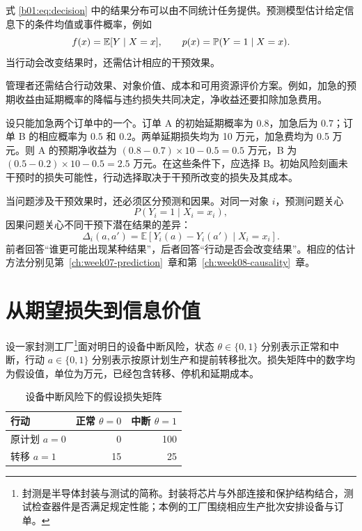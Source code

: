 式 \eqref{b01:eq:decision} 中的结果分布可以由不同统计任务提供。预测模型估计给定信息下的条件均值或事件概率，例如
\[
f(x)=\mathbb E[Y\mid X=x],\qquad p(x)=\mathbb P(Y=1\mid X=x).
\]
当行动会改变结果时，还需估计相应的干预效果。

管理者还需结合行动效果、对象价值、成本和可用资源评价方案。例如，加急的预期收益由延期概率的降幅与违约损失共同决定，净收益还要扣除加急费用。

\begin{example}[风险排序与行动选择]
设只能加急两个订单中的一个。订单 A 的初始延期概率为 \(0.8\)，加急后为 \(0.7\)；订单 B 的相应概率为 \(0.5\) 和 \(0.2\)。两单延期损失均为 10 万元，加急费均为 0.5 万元。则 A 的预期净收益为 \((0.8-0.7)\times10-0.5=0.5\) 万元，B 为 \((0.5-0.2)\times10-0.5=2.5\) 万元。在这些条件下，应选择 B。初始风险刻画未干预时的损失可能性，行动选择取决于干预所改变的损失及其成本。
\end{example}

当问题涉及干预效果时，还必须区分预测和因果。对同一对象 \(i\)，预测问题关心
\[
P(Y_i=1\mid X_i=x_i),
\]
因果问题关心不同干预下潜在结果的差异：
\[
\Delta_i(a,a')
=
\mathbb E\!\left[Y_i(a)-Y_i(a')\mid X_i=x_i\right].
\]
前者回答“谁更可能出现某种结果”，后者回答“行动是否会改变结果”。相应的估计方法分别见第~\ref{ch:week07-prediction}~章和第~\ref{ch:week08-causality}~章。

\section{从期望损失到信息价值}
\label{sec:information-value}

设一家封测工厂\footnote{封测是半导体封装与测试的简称。封装将芯片与外部连接和保护结构结合，测试检查器件是否满足规定性能；本例的工厂围绕相应生产批次安排设备与订单。}面对明日的设备中断风险，状态 \(\theta\in\{0,1\}\) 分别表示正常和中断，行动 \(a\in\{0,1\}\) 分别表示按原计划生产和提前转移批次。损失矩阵中的数字均为假设值，单位为万元，已经包含转移、停机和延期成本。

\begin{table}[htbp]
\centering
\caption{设备中断风险下的假设损失矩阵}
\begin{tabular}{lrr}
\toprule
\rowcolor{BDMTableHead}
行动 & 正常 \(\theta=0\) & 中断 \(\theta=1\)\\
\midrule
原计划 \(a=0\) & 0 & 100\\
转移 \(a=1\) & 15 & 25\\
\bottomrule
\end{tabular}
\end{table}

